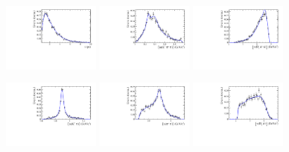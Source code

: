 \begin{figure}[h]
	\centering
		\includegraphics[width=0.3\textwidth, height = !]{figs/fullFit/signal/h_t.pdf} 
		\includegraphics[width=0.3\textwidth, height = !]{figs/fullFit/signal/m_Kpipi.pdf} 
		\includegraphics[width=0.3\textwidth, height = !]{figs/fullFit/signal/m_Dspipi.pdf} 

		\includegraphics[width=0.3\textwidth, height = !]{figs/fullFit/signal/m_Kpi.pdf} 
		\includegraphics[width=0.3\textwidth, height = !]{figs/fullFit/signal/m_pipi.pdf} 
		\includegraphics[width=0.3\textwidth, height = !]{figs/fullFit/signal/m_Dspi.pdf} 


\end{figure}
